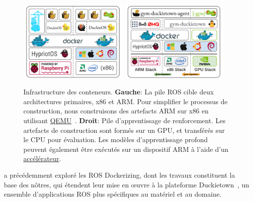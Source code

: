 \begin{figure}[ht]
\centering
\includegraphics[width=0.48\textwidth]{../figures/docker_stack_1.png}
\includegraphics[width=0.48\textwidth]{../figures/docker_stack_2.png}
\caption{Infrastructure des conteneurs. \textbf{Gauche}: La pile ROS cible deux architectures primaires, x86 et ARM. Pour simplifier le processus de construction, nous construisons des artefacts ARM sur x86 en utilisant \href{https://www.qemu.org}{QEMU}~\citep{bellard2005qemu}. \textbf{Droit}: Pile d'apprentissage de renforcement. Les artefacts de construction sont formés sur un GPU, et transférés sur le CPU pour évaluation. Les modèles d'apprentissage profond peuvent également être exécutés sur un dispositif ARM à l'aide d'un \href{https://software.intel.com/en-us/neural-compute-stick}{accélérateur}.}
\label{fig:docker}
\end{figure}

\citet{white2017ros-docker} a précédemment exploré les ROS Dockerizing, dont les travaux constituent la base des nôtres, qui étendent leur mise en œuvre à la plateforme Duckietown~\citep{paull2017duckietown}, un ensemble d'applications ROS plus spécifiques au matériel et au domaine.

